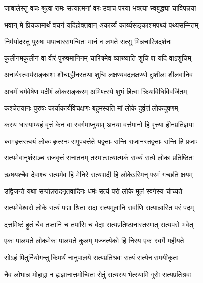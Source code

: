 
\twolineshloka
{जाबालेस्तु वचः श्रुत्वा रामः सत्यात्मनां वरः}
{उवाच परया भक्त्या स्वबुद्ध्या चाविपन्नया} %

\twolineshloka
{भवान् मे प्रियकामार्थं वचनं यदिहोक्तवान्}
{अकार्य्यं कार्य्यसङ्काशमपथ्यं पथ्यसम्मितम्} %

\twolineshloka
{निर्मर्यादस्तु पुरुषः पापाचारसमन्वितः}
{मानं न लभते सत्सु भिन्नचारित्रदर्शनः} %

\twolineshloka
{कुलीनमकुलीनं वा वीरं पुरुषमानिनम्}
{चारित्रमेव व्याख्याति शुचिं वा यदि वाऽशुचिम्} %

\twolineshloka
{अनार्यस्त्वार्यसङ्काशः शौचाद्धीनस्तथा शुचिः}
{लक्षण्यवदलक्षण्यो दुःशीलः शीलवानिव} %

\twolineshloka
{अधर्मं धर्मवेषेण यदीमं लोकसङ्करम्}
{अभिपत्स्ये शुभं हित्वा क्रियाविधिविवर्जितम्} %

\twolineshloka
{कश्चेतयानः पुरुषः कार्याकार्यविचक्षणः}
{बहुमंस्यति मां लोके दुर्वृत्तं लोकदूषणम्} %

\twolineshloka
{कस्य धास्याम्यहं वृत्तं केन वा स्वर्गमाप्नुयाम्}
{अनया वर्त्तमानो हि वृत्त्या हीनप्रतिज्ञया} %

\twolineshloka
{कामवृत्तस्त्वयं लोकः कृत्स्नः समुपवर्त्तते}
{यद्वृत्ताः सन्ति राजानस्तद्वृत्ताः सन्ति हि प्रजाः} %

\twolineshloka
{सत्यमेवानृशंसञ्च राजवृत्तं सनातनम्}
{तस्मात्सत्यात्मकं राज्यं सत्ये लोकः प्रतिष्ठितः} %

\twolineshloka
{ऋषयश्चैव देवाश्च सत्यमेव हि मेनिरे}
{सत्यवादी हि लोकेऽस्मिन् परमं गच्छति क्षयम्} %

\twolineshloka
{उद्विजन्ते यथा सर्प्पान्नरादनृतवादिनः}
{धर्मः सत्यं परो लोके मूलं स्वर्गस्य चोच्यते} %

\twolineshloka
{सत्यमेवेश्वरो लोके सत्यं पद्मा श्रिता सदा}
{सत्यमूलानि सर्वाणि सत्यान्नास्ति परं पदम्} %

\twolineshloka
{दत्तमिष्टं हुतं चैव तप्तानि च तपांसि च}
{वेदाः सत्यप्रतिष्ठानास्तस्मात् सत्यपरो भवेत्} %

\twolineshloka
{एकः पालयते लोकमेकः पालयते कुलम्}
{मज्जत्येको हि निरय एकः स्वर्गे महीयते} %

\twolineshloka
{सोऽहं पितुर्नियोगन्तु किमर्थं नानुपालये}
{सत्यप्रतिश्रवः सत्यं सत्येन समयीकृतः} %

\twolineshloka
{नैव लोभान्न मोहाद्वा न ह्यज्ञानात्तमोन्वितः}
{सेतुं सत्यस्य भेत्स्यामि गुरोः सत्यप्रतिश्रवः} %

